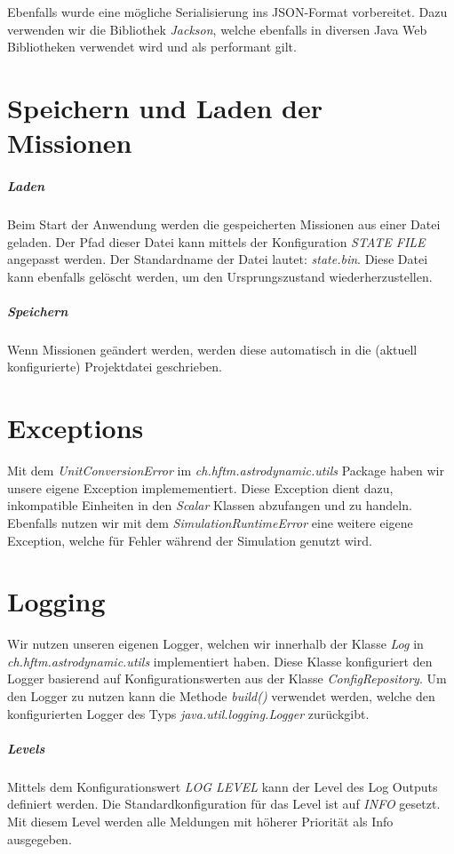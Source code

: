 Ebenfalls wurde eine mögliche Serialisierung ins JSON-Format vorbereitet. Dazu verwenden wir die Bibliothek \textit{Jackson}, welche ebenfalls in diversen Java Web Bibliotheken verwendet wird und als performant gilt.

\section{Speichern und Laden der Missionen}

\subparagraph{Laden}
Beim Start der Anwendung werden die gespeicherten Missionen aus einer Datei geladen.
Der Pfad dieser Datei kann mittels der Konfiguration \textit{STATE FILE} angepasst werden.
Der Standardname der Datei lautet: \textit{state.bin}.
Diese Datei kann ebenfalls gelöscht werden, um den Ursprungszustand wiederherzustellen.

\subparagraph{Speichern}
Wenn Missionen geändert werden, werden diese automatisch in die (aktuell konfigurierte) Projektdatei geschrieben.


\section{Exceptions}

Mit dem \textit{UnitConversionError} im \textit{ch.hftm.astrodynamic.utils} Package haben wir unsere eigene Exception implemementiert.
Diese Exception dient dazu, inkompatible Einheiten in den \textit{Scalar} Klassen abzufangen und zu handeln.
Ebenfalls nutzen wir mit dem \textit{SimulationRuntimeError} eine weitere eigene Exception, welche für Fehler während der Simulation genutzt wird.

\section{Logging}

Wir nutzen unseren eigenen Logger, welchen wir innerhalb der Klasse \textit{Log} in \textit{ch.hftm.astrodynamic.utils} implementiert haben.
Diese Klasse konfiguriert den Logger basierend auf Konfigurationswerten aus der Klasse \textit{ConfigRepository}.
Um den Logger zu nutzen kann die Methode \textit{build()} verwendet werden, welche den konfigurierten Logger des Typs \textit{java.util.logging.Logger} zurückgibt.

\subparagraph{Levels}

Mittels dem Konfigurationswert \textit{LOG LEVEL} kann der Level des Log Outputs definiert werden.
Die Standardkonfiguration für das Level ist auf \textit{INFO} gesetzt. Mit diesem Level werden alle Meldungen mit höherer Priorität als Info ausgegeben. 

